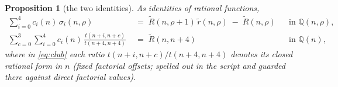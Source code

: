 \documentclass[11pt]{article}
\theoremstyle{plain}
\newtheorem{proposition}[theorem]{Proposition}
\theoremstyle{definition}
\theoremstyle{remark}
\newcommand{\Rt}{\widetilde{R}}
\newcommand{\QQ}{\mathbb{Q}}
\begin{document}
\begin{proposition}[the two identities]\label{prop:ids}
As identities of rational functions,
\begin{align}
  \sum_{i=0}^{4}c_i(n)\,\sigma_i(n,\rho)
   \;&=\;\Rt(n,\rho{+}1)\,\tilde r(n,\rho)\;-\;\Rt(n,\rho)
   &&\text{in }\QQ(n,\rho), \tag{$\diamondsuit$}\label{eq:diamond}\\[2pt]
  \sum_{c=0}^{3}\sum_{i=0}^{4}c_i(n)\,\frac{t(n{+}i,n{+}c)}{t(n{+}4,n{+}4)}
   \;&=\;\Rt(n,n{+}4)
   &&\text{in }\QQ(n), \tag{$\clubsuit$}\label{eq:club}
\end{align}
where in \eqref{eq:club} each ratio $t(n{+}i,n{+}c)/t(n{+}4,n{+}4)$ denotes its closed rational
form in $n$ (fixed factorial offsets; spelled out in the script and guarded there against direct
factorial values).
\end{proposition}
\end{document}
